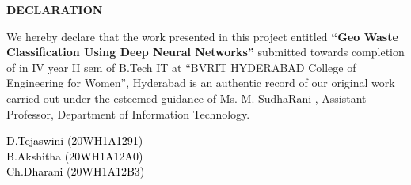 \documentclass[12pt, English]{article}
\begin{document}
\newcommand{\CC}{C\nolinebreak\hspace{-.05em}\raisebox{.4ex}{\tiny\bf +}\nolinebreak\hspace{-
.10em}\raisebox{.4ex}{\tiny\bf +}}
\def\CC{{C\nolinebreak[4]\hspace{-.05em}\raisebox{.4ex}{\tiny\bf ++}}}
\begin{titlepage}
\begin{center}
\textbf{\LARGE DECLARATION}\\
\end{center}
\vspace*{0.2in}

We hereby declare that the work presented in this project entitled {\textbf{“Geo Waste Classification Using Deep Neural Networks”}} submitted towards completion of in IV year II
sem of B.Tech IT at “BVRIT HYDERABAD College of Engineering for Women”, Hyderabad is an authentic record of our original work carried out under the esteemed guidance of { Ms. M. SudhaRani , Assistant
Professor}, Department of Information Technology.

\raggedleft
\vspace*{0.5in}

\textcolor{black}{D.Tejaswini (20WH1A1291)}\\
\raggedleft
\vspace*{0.3in}
\textcolor{black}{B.Akshitha (20WH1A12A0)}\\
\raggedleft
\vspace*{0.3in}
\textcolor{black}{Ch.Dharani (20WH1A12B3)}\\
\raggedleft

\end{titlepage}
\end{document}
